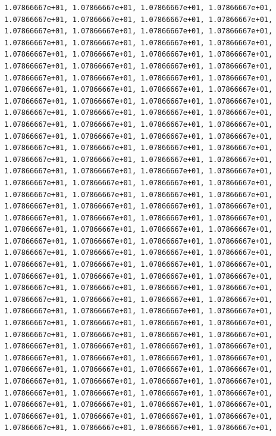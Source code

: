\documentclass[
  letterpaper,
]{scrreprt}
\begin{document}
\begin{verbatim}
       1.07866667e+01, 1.07866667e+01, 1.07866667e+01, 1.07866667e+01,
       1.07866667e+01, 1.07866667e+01, 1.07866667e+01, 1.07866667e+01,
       1.07866667e+01, 1.07866667e+01, 1.07866667e+01, 1.07866667e+01,
       1.07866667e+01, 1.07866667e+01, 1.07866667e+01, 1.07866667e+01,
       1.07866667e+01, 1.07866667e+01, 1.07866667e+01, 1.07866667e+01,
       1.07866667e+01, 1.07866667e+01, 1.07866667e+01, 1.07866667e+01,
       1.07866667e+01, 1.07866667e+01, 1.07866667e+01, 1.07866667e+01,
       1.07866667e+01, 1.07866667e+01, 1.07866667e+01, 1.07866667e+01,
       1.07866667e+01, 1.07866667e+01, 1.07866667e+01, 1.07866667e+01,
       1.07866667e+01, 1.07866667e+01, 1.07866667e+01, 1.07866667e+01,
       1.07866667e+01, 1.07866667e+01, 1.07866667e+01, 1.07866667e+01,
       1.07866667e+01, 1.07866667e+01, 1.07866667e+01, 1.07866667e+01,
       1.07866667e+01, 1.07866667e+01, 1.07866667e+01, 1.07866667e+01,
       1.07866667e+01, 1.07866667e+01, 1.07866667e+01, 1.07866667e+01,
       1.07866667e+01, 1.07866667e+01, 1.07866667e+01, 1.07866667e+01,
       1.07866667e+01, 1.07866667e+01, 1.07866667e+01, 1.07866667e+01,
       1.07866667e+01, 1.07866667e+01, 1.07866667e+01, 1.07866667e+01,
       1.07866667e+01, 1.07866667e+01, 1.07866667e+01, 1.07866667e+01,
       1.07866667e+01, 1.07866667e+01, 1.07866667e+01, 1.07866667e+01,
       1.07866667e+01, 1.07866667e+01, 1.07866667e+01, 1.07866667e+01,
       1.07866667e+01, 1.07866667e+01, 1.07866667e+01, 1.07866667e+01,
       1.07866667e+01, 1.07866667e+01, 1.07866667e+01, 1.07866667e+01,
       1.07866667e+01, 1.07866667e+01, 1.07866667e+01, 1.07866667e+01,
       1.07866667e+01, 1.07866667e+01, 1.07866667e+01, 1.07866667e+01,
       1.07866667e+01, 1.07866667e+01, 1.07866667e+01, 1.07866667e+01,
       1.07866667e+01, 1.07866667e+01, 1.07866667e+01, 1.07866667e+01,
       1.07866667e+01, 1.07866667e+01, 1.07866667e+01, 1.07866667e+01,
       1.07866667e+01, 1.07866667e+01, 1.07866667e+01, 1.07866667e+01,
       1.07866667e+01, 1.07866667e+01, 1.07866667e+01, 1.07866667e+01,
       1.07866667e+01, 1.07866667e+01, 1.07866667e+01, 1.07866667e+01,
       1.07866667e+01, 1.07866667e+01, 1.07866667e+01, 1.07866667e+01,
       1.07866667e+01, 1.07866667e+01, 1.07866667e+01, 1.07866667e+01,
       1.07866667e+01, 1.07866667e+01, 1.07866667e+01, 1.07866667e+01,
       1.07866667e+01, 1.07866667e+01, 1.07866667e+01, 1.07866667e+01,
       1.07866667e+01, 1.07866667e+01, 1.07866667e+01, 1.07866667e+01,
       1.07866667e+01, 1.07866667e+01, 1.07866667e+01, 1.07866667e+01,
       1.07866667e+01, 1.07866667e+01, 1.07866667e+01, 1.07866667e+01,

\end{verbatim}
\end{document}
